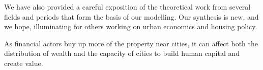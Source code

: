 We have also provided a careful exposition of the theoretical work from several fields and periods that form the basis of our modelling. Our synthesis is new, and we hope, illuminating for others working on urban economics and housing policy.


As financial actors buy up more of the property near cities, it can affect both the distribution of wealth and the capacity of cities to build human capital and create value. 













